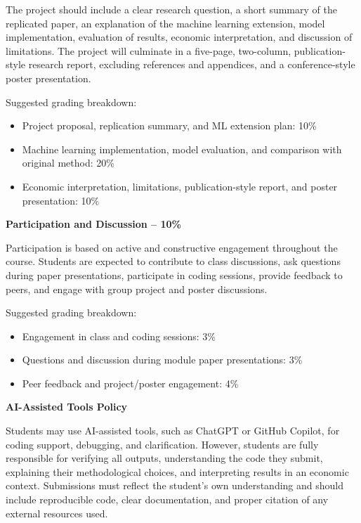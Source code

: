 \documentclass[11pt]{article}
\begin{document}
The project should include a clear research question, a short summary of the replicated paper, an explanation of the machine learning extension, model implementation, evaluation of results, economic interpretation, and discussion of limitations. The project will culminate in a five-page, two-column, publication-style research report, excluding references and appendices, and a conference-style poster presentation.

\vspace{4pt}
\noindent Suggested grading breakdown:
\begin{itemize}[leftmargin=1.5em]
    \item Project proposal, replication summary, and ML extension plan: 10\%
    \item Machine learning implementation, model evaluation, and comparison with original method: 20\%
    \item Economic interpretation, limitations, publication-style report, and poster presentation: 10\%
\end{itemize}

\noindent \textbf{Participation and Discussion -- 10\%}

Participation is based on active and constructive engagement throughout the course. Students are expected to contribute to class discussions, ask questions during paper presentations, participate in coding sessions, provide feedback to peers, and engage with group project and poster discussions.

\vspace{4pt}
\noindent Suggested grading breakdown:
\begin{itemize}[leftmargin=1.5em]
    \item Engagement in class and coding sessions: 3\%
    \item Questions and discussion during module paper presentations: 3\%
    \item Peer feedback and project/poster engagement: 4\%
\end{itemize}

\noindent \textbf{AI-Assisted Tools Policy}

Students may use AI-assisted tools, such as ChatGPT or GitHub Copilot, for coding support, debugging, and clarification. However, students are fully responsible for verifying all outputs, understanding the code they submit, explaining their methodological choices, and interpreting results in an economic context. Submissions must reflect the student's own understanding and should include reproducible code, clear documentation, and proper citation of any external resources used.
\end{document}
